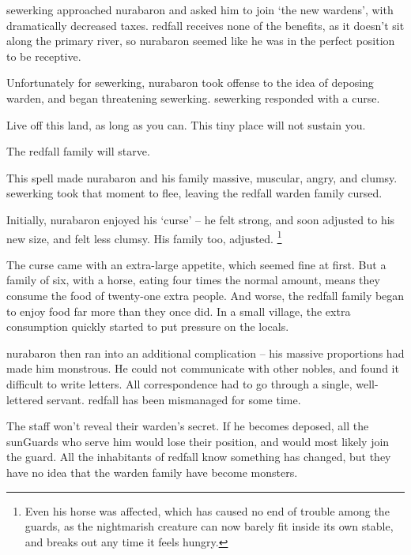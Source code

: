 \label{desperatemeasures}

\begin{exampletext}
  \Gls{sewerking} approached \gls{nurabaron} and asked him to join `the new \glspl{warden}', with dramatically decreased taxes.
  \Gls{redfall} receives none of the benefits, as it doesn't sit along the primary river, so \gls{nurabaron} seemed like he was in the perfect position to be receptive.

  Unfortunately for \gls{sewerking}, \gls{nurabaron} took offense to the idea of deposing \gls{warden}, and began threatening \gls{sewerking}.
  \Gls{sewerking} responded with a curse.

  \begin{speechtext}
    Live off this land, as long as you can.
    This tiny place will not sustain you.

    The \gls{redfall} family will starve.

  \end{speechtext}
  This spell made \gls{nurabaron} and his family massive, muscular, angry, and clumsy.
  \Gls{sewerking} took that moment to flee, leaving the \gls{redfall} \gls{warden} family cursed.

  Initially, \gls{nurabaron} enjoyed his `curse' -- he felt strong, and soon adjusted to his new size, and felt less clumsy.
  His family too, adjusted.%
  \footnote{Even his horse was affected, which has caused no end of trouble among the guards, as the nightmarish creature can now barely fit inside its own stable, and breaks out any time it feels hungry.}

  The curse came with an extra-large appetite, which seemed fine at first.
  But a family of six, with a horse, eating four times the normal amount, means they consume the food of twenty-one extra people.
  And worse, the \gls{redfall} family began to enjoy food far more than they once did.
  In a small \gls{village}, the extra consumption quickly started to put pressure on the locals.

  \Gls{nurabaron} then ran into an additional complication -- his massive proportions had made him monstrous.
  He could not communicate with other nobles, and found it difficult to write letters.
  All correspondence had to go through a single, well-lettered servant.
  \Gls{redfall} has been mismanaged for some time.

  The staff won't reveal their \gls{warden}'s secret.
  If he becomes deposed, all the \glspl{sunGuard} who serve him would lose their position, and would most likely join the \gls{guard}.
  All the inhabitants of \gls{redfall} know something has changed, but they have no idea that the \gls{warden} family have become monsters.
\end{exampletext}

